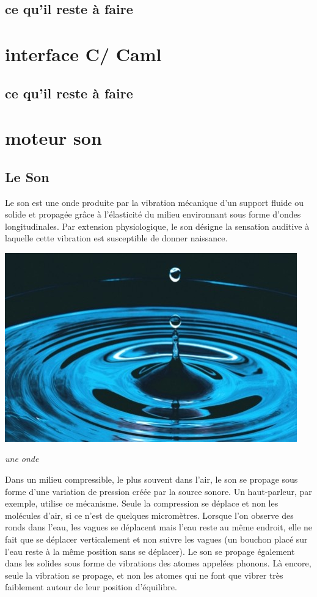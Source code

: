 \documentclass[12pt]{report}
\begin{document}
	\section{ce qu'il reste à faire}


\chapter{interface C/ Caml}
\section{ce qu'il reste à faire}


\chapter{moteur son}

\section{Le Son}


Le son est une onde produite par la vibration mécanique d'un support fluide ou solide et propagée grâce à l'élasticité du milieu environnant sous forme d'ondes longitudinales. Par extension physiologique, le son désigne la sensation auditive à laquelle cette vibration est susceptible de donner naissance.\\
\begin{center}
\includegraphics[scale=0.5]{onde.jpg}

\it{ une onde}
\end{center}

Dans un milieu compressible, le plus souvent dans l'air, le son se propage sous forme d'une variation de pression créée par la source sonore. Un haut-parleur, par exemple, utilise ce mécanisme. Seule la compression se déplace et non les molécules d'air, si ce n'est de quelques micromètres. Lorsque l'on observe des ronds dans l'eau, les vagues se déplacent mais l'eau reste au même endroit, elle ne fait que se déplacer verticalement et non suivre les vagues (un bouchon placé sur l'eau reste à la même position sans se déplacer). Le son se propage également dans les solides sous forme de vibrations des atomes appelées phonons. Là encore, seule la vibration se propage, et non les atomes qui ne font que vibrer très faiblement autour de leur position d'équilibre.\\
\end{document}

